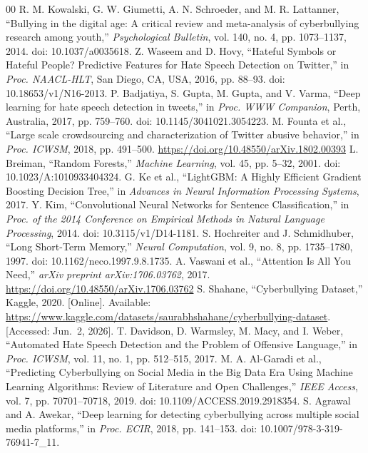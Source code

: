 \begin{thebibliography}{00}
 R. M. Kowalski, G. W. Giumetti, A. N. Schroeder, and M. R. Lattanner, ``Bullying in the digital age: A critical review and meta-analysis of cyberbullying research among youth,'' \textit{Psychological Bulletin}, vol. 140, no. 4, pp. 1073--1137, 2014. doi: 10.1037/a0035618.
 Z. Waseem and D. Hovy, ``Hateful Symbols or Hateful People? Predictive Features for Hate Speech Detection on Twitter,'' in \textit{Proc. NAACL-HLT}, San Diego, CA, USA, 2016, pp. 88--93. doi: 10.18653/v1/N16-2013.
 P. Badjatiya, S. Gupta, M. Gupta, and V. Varma, ``Deep learning for hate speech detection in tweets,'' in \textit{Proc. WWW Companion}, Perth, Australia, 2017, pp. 759--760. doi: 10.1145/3041021.3054223.
 M. Founta et al., ``Large scale crowdsourcing and characterization of Twitter abusive behavior,'' in \textit{Proc. ICWSM}, 2018, pp. 491--500. \url{https://doi.org/10.48550/arXiv.1802.00393}
 L. Breiman, ``Random Forests,'' \textit{Machine Learning}, vol. 45, pp. 5--32, 2001. doi: 10.1023/A:1010933404324.
 G. Ke et al., ``LightGBM: A Highly Efficient Gradient Boosting Decision Tree,'' in \textit{Advances in Neural Information Processing Systems}, 2017.
 Y. Kim, ``Convolutional Neural Networks for Sentence Classification,'' in \textit{Proc. of the 2014 Conference on Empirical Methods in Natural Language Processing}, 2014. doi: 10.3115/v1/D14-1181.
 S. Hochreiter and J. Schmidhuber, ``Long Short-Term Memory,'' \textit{Neural Computation}, vol. 9, no. 8, pp. 1735--1780, 1997. doi: 10.1162/neco.1997.9.8.1735.
 A. Vaswani et al., ``Attention Is All You Need,'' \textit{arXiv preprint arXiv:1706.03762}, 2017. \url{https://doi.org/10.48550/arXiv.1706.03762}
 S. Shahane, ``Cyberbullying Dataset,'' Kaggle, 2020. [Online]. Available: \url{https://www.kaggle.com/datasets/saurabhshahane/cyberbullying-dataset}. [Accessed: Jun.~2, 2026].
 T. Davidson, D. Warmsley, M. Macy, and I. Weber, ``Automated Hate Speech Detection and the Problem of Offensive Language,'' in \textit{Proc. ICWSM}, vol. 11, no. 1, pp. 512--515, 2017.
 M. A. Al-Garadi et al., ``Predicting Cyberbullying on Social Media in the Big Data Era Using Machine Learning Algorithms: Review of Literature and Open Challenges,'' \textit{IEEE Access}, vol. 7, pp. 70701--70718, 2019. doi: 10.1109/ACCESS.2019.2918354.
 S. Agrawal and A. Awekar, ``Deep learning for detecting cyberbullying across multiple social media platforms,'' in \textit{Proc. ECIR}, 2018, pp. 141--153. doi: 10.1007/978-3-319-76941-7\_11.

\end{thebibliography}
